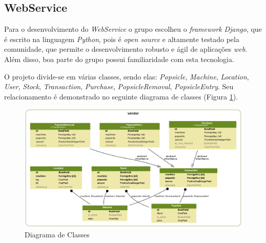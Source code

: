 \subsection{WebService}

Para o desenvolvimento do \textit{WebService} o grupo escolheu o \textit{framework} \textit{Django}, que é escrito na linguagem \textit{Python}, pois é \textit{open source} e altamente testado pela comunidade, que permite o desenvolvimento robusto e ágil de aplicações \textit{web}. Além disso, boa parte do grupo possui familiaridade com esta tecnologia.

O projeto divide-se em várias classes, sendo elas: \textit{Popsicle}, \textit{Machine}, \textit{Location}, \textit{User}, \textit{Stock}, \textit{Transaction}, \textit{Purchase}, \textit{PopsicleRemoval}, \textit{PopsicleEntry}. Seu relacionamento é demonstrado no seguinte diagrama de classes (Figura \ref{fig:diagrama_classes}).

\begin{figure}[H]
\centering
\includegraphics[width=\textwidth]{figuras/diagrama_classes}
\caption{Diagrama de Classes}
\label{fig:diagrama_classes}
\end{figure}

